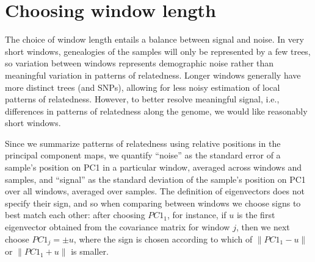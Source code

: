 \documentclass[11pt, oneside]{article}   	%
\newif\ifsubmission
\renewcommand{\linelabel}[1]{}
\newcommand{\pcone}{PC1}
\begin{document}
\appendix
\setcounter{table}{0}
\renewcommand{\thetable}{S\arabic{table}}
\setcounter{figure}{0}
\renewcommand{\thefigure}{S\arabic{figure}}
\ifsubmission
    \setcounter{postfigure}{0}
    \renewcommand{\thepostfigure}{S\arabic{postfigure}}
\fi

\section{Choosing window length}
\label{apx:window_length}

The choice of window length entails a balance between signal and noise.
In very short windows, genealogies of the samples will only be represented by a few trees,
so variation between windows represents demographic noise rather than meaningful variation in patterns of relatedness.
Longer windows generally have more distinct trees (and SNPs), 
allowing for less noisy estimation of local patterns of relatedness.
However, to better resolve meaningful signal, i.e., differences in patterns of relatedness along the genome,
we would like reasonably short windows.

Since we summarize patterns of relatedness using relative positions in the principal component maps,
we quantify ``noise'' as the standard error of a sample's position on PC1 in a particular window,
averaged across windows and samples,
and ``signal'' as the standard deviation of the sample's position on PC1 over all windows,
averaged over samples.
The definition of eigenvectors does not specify their sign,
and so when comparing between windows we choose signs to best match each other:
after choosing $\pcone_1$, for instance, 
if $u$ is the first eigenvector obtained from the covariance matrix
for window $j$,
then we next choose $\pcone_j = \pm u$,
where the sign is chosen according to which of 
$\| \pcone_{1} - u \|$ or
$\| \pcone_{1} + u \|$ 
is smaller.
\linelabel{ll:moved_pc_note}
\end{document}
